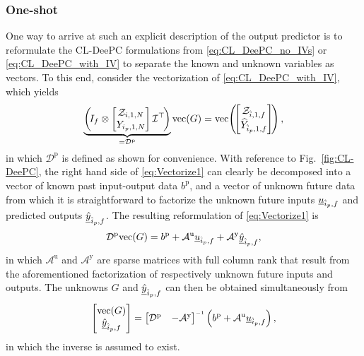 \subsubsection{One-shot}
One way to arrive at such an explicit description of the output predictor is to reformulate the \ac{CL-DeePC} formulations from \eqref{eq:CL_DeePC_no_IVs} or \eqref{eq:CL_DeePC_with_IV} to separate the known and unknown variables as vectors. To this end, consider the vectorization of \eqref{eq:CL_DeePC_with_IV}, which yields
\begin{align}\label{eq:Vectorize1}
    \underbrace{\left(\mkern-3mu I_f \otimes \begin{bmatrix}
        \mathcal{Z}_{i,1,N}\\
        Y_{i_p,1,N}
    \end{bmatrix}{\mathcal{I}}^\top\mkern-3mu\right)}_{=\mathcal{D}^\mathrm{p}}\text{vec}(G)=\text{vec}\mkern-3mu\left(\mkern-3mu\begin{bmatrix}
        \mathcal{Z}_{\hat{i},1,f}\\
        \widehat{Y}_{\hat{i}_p,1,f}
    \end{bmatrix}\mkern-3mu\right),
\end{align}%
in which $\mathcal{D}^\mathrm{p}$ is defined as shown for convenience. With reference to Fig.~\ref{fig:CL-DeePC}, the right hand side of \eqref{eq:Vectorize1} can clearly be decomposed into a vector of known past input-output data $b^\mathrm{p}$, and a vector of unknown future data from which it is straightforward to factorize the unknown future inputs $\underline{u}_{\hat{i}_p,f}$ and predicted outputs $\underline{\hat{y}}_{\hat{i}_p,f}$. The resulting reformulation of \eqref{eq:Vectorize1} is
\begin{align}
    \mathcal{D}^\mathrm{p}\text{vec}(G) = b^\mathrm{p}+\mathcal{A}^\mathrm{u}\underline{u}_{\hat{i}_p,f} + \mathcal{A}^\mathrm{y}\underline{\hat{y}}_{\hat{i}_p,f},
\end{align}
in which $\mathcal{A}^\mathrm{u}$ and $\mathcal{A}^\mathrm{y}$ are sparse matrices with full column rank that result from the aforementioned factorization of respectively unknown future inputs and outputs. The unknowns $G$ and $\underline{\hat{y}}_{\hat{i}_p,f}$ can then be obtained simultaneously from
\begin{align}
    \begin{bmatrix}
        \text{vec}(G)\\
        \datavec{\hat{y}}{\hat{i}_p,f}
    \end{bmatrix} =
    \begin{bmatrix}
        \mathcal{D}^\mathrm{p} & -\mathcal{A}^\mathrm{y}
    \end{bmatrix}\inv \left(b^\mathrm{p} + \mathcal{A}^\mathrm{u}\datavec{u}{\hat{i}_p,f}\right),
\end{align}
in which the inverse is assumed to exist.
%
